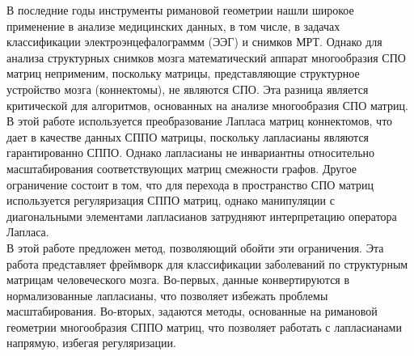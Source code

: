 \indent В последние годы инструменты римановой геометрии нашли широкое применение в анализе медицинских данных, в том числе, в задачах классификации электроэнцефалограммм (ЭЭГ) и снимков МРТ. Однако для анализа структурных снимков мозга математический аппарат многообразия СПО матриц неприменим, поскольку матрицы, представляющие структурное устройство мозга (коннектомы), не являются СПО. Эта разница является критической для алгоритмов, основанных на анализе многообразия СПО матриц.\\
В этой работе используется преобразование Лапласа матриц коннектомов, что дает в качестве данных СППО матрицы, поскольку лапласианы являются гарантированно СППО. Однако лапласианы не инвариантны относительно масштабирования соответствующих матриц смежности графов. Другое ограничение состоит в том, что для перехода в пространство СПО матриц используется регуляризация СППО матриц, однако манипуляции с диагональными элементами лапласианов затрудняют интерпретацию оператора Лапласа.\\
\indent В этой работе предложен метод, позволяющий обойти эти ограничения. Эта работа представляет фреймворк для классификации заболеваний по структурным матрицам человеческого мозга. Во-первых, данные конвертируются в нормализованные лапласианы, что позволяет избежать проблемы масштабирования. Во-вторых, задаются методы, основанные на римановой геометрии многообразия СППО матриц, что позволяет работать с лапласианами напрямую, избегая регуляризации.
